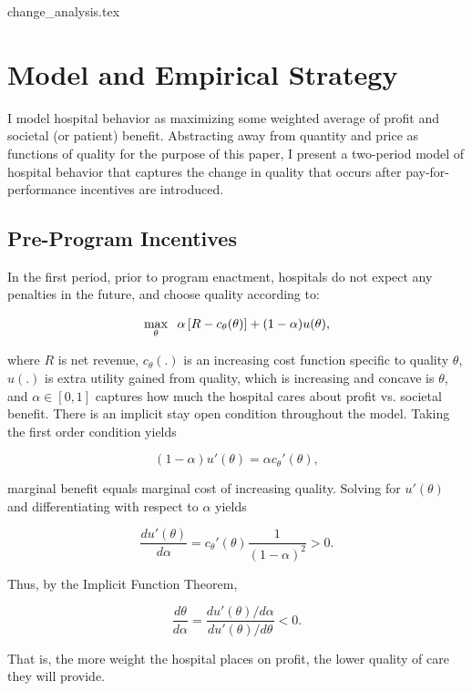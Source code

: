 \documentclass[12pt]{article}
\begin{document}
     {change_analysis.tex}

    

    \section{Model and Empirical Strategy}\label{sec:model}

    I model hospital behavior as maximizing some weighted average of profit and societal (or patient) benefit. Abstracting away from quantity and price as functions of quality for the purpose of this paper, I present a two-period model of hospital behavior that captures the change in quality that occurs after pay-for-performance incentives are introduced. 
    
    \subsection{Pre-Program Incentives}
    
    In the first period, prior to program enactment, hospitals do not expect any penalties in the future, and choose quality according to:    
    
    $$\max_{\theta}\hspace{2mm}\alpha\left[R - c_{\theta}(\theta) \right] + (1-\alpha) u(\theta),$$

    \noindent where $R$ is net revenue, $c_{\theta}(.)$ is an increasing cost function specific to quality $\theta$, $u(.)$ is extra utility gained from quality, which is increasing and concave is $\theta$, and $\alpha\in[0,1]$ captures how much the hospital cares about profit vs. societal benefit. There is an implicit stay open condition throughout the model. Taking the first order condition yields 

    $$(1-\alpha)u'(\theta) = \alpha c_{\theta}'(\theta),$$

    \noindent marginal benefit equals marginal cost of increasing quality. Solving for $u'(\theta)$ and differentiating with respect to $\alpha$ yields

    $$\frac{du'(\theta)}{d\alpha} = c_{\theta}'(\theta)\frac{1}{(1-\alpha)^2} > 0.$$

    \noindent Thus, by the Implicit Function Theorem, 

    $$\frac{d\theta}{d\alpha} = \frac{du'(\theta)/d\alpha}{du'(\theta)/d\theta} < 0.$$

    \noindent That is, the more weight the hospital places on profit, the lower quality of care they will provide.
\end{document}
